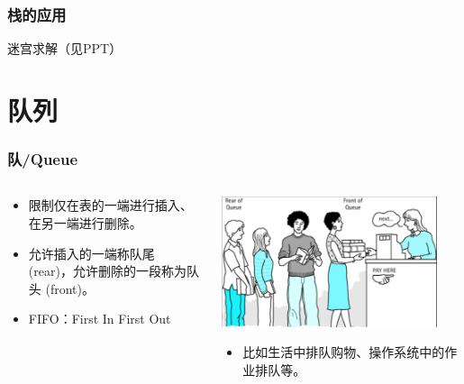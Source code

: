 \begin{frame}[fragile]
  \frametitle{栈的应用}
  迷宫求解（见PPT）
\end{frame}

\section{队列}

\begin{frame}[fragile]
  \frametitle{队/Queue}
   \begin{columns}
    \begin{column}[T]{0.5\linewidth}
      \begin{tcolorbox}[colframe=blue!80, height=6.5cm, title=队/Queue]
        \small
        \begin{itemize}
        \item 限制仅在表的一端进行插入、在另一端进行删除。
        \item 允许插入的一端称队尾 (rear)，允许删除的一段称为队头 (front)。
        \item FIFO：First In First Out
        \end{itemize}
      \end{tcolorbox}
    \end{column}
    \begin{column}[T]{0.5\linewidth}
      \includegraphics[width=0.9\textwidth]{figs/queue/queueofpeople.png}

      \begin{itemize}
      \item 比如生活中排队购物、操作系统中的作业排队等。
      \end{itemize}
    \end{column}
  \end{columns}
\end{frame}


